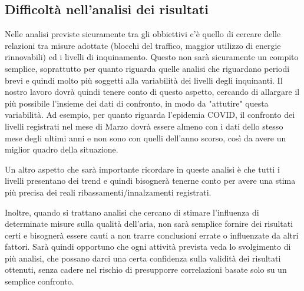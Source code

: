 \documentclass{article}
\begin{document}
\subsection{Difficoltà nell'analisi dei risultati}
Nelle analisi previste sicuramente tra gli obbiettivi c'è quello di cercare delle relazioni tra misure adottate (blocchi del traffico, maggior utilizzo di energie rinnovabili) ed i livelli di inquinamento. Questo non sarà sicuramente un compito semplice, soprattutto per quanto riguarda quelle analisi che riguardano periodi brevi e quindi molto più soggetti alla variabilità dei livelli degli inquinanti. Il nostro lavoro dovrà quindi tenere conto di questo aspetto, cercando di allargare il più possibile l'insieme dei dati di confronto, in modo da "attutire" questa variabilità. Ad esempio, per quanto riguarda l'epidemia COVID, il confronto dei livelli registrati nel mese di Marzo dovrà essere almeno con i dati dello stesso mese degli ultimi anni e non sono con quelli dell'anno scorso, così da avere un miglior quadro della situazione.

Un altro aspetto che sarà importante ricordare in queste analisi è che tutti i livelli presentano dei trend e quindi bisognerà tenerne conto per avere una stima più precisa dei reali ribassamenti/innalzamenti registrati.

Inoltre, quando si trattano analisi che cercano di stimare l'influenza di determinate misure sulla qualità dell'aria, non sarà semplice fornire dei risultati certi e bisognerà essere cauti a non trarre conclusioni errate o influenzate da altri fattori. Sarà quindi opportuno che ogni attività prevista veda lo svolgimento di più analisi, che possano darci una certa confidenza sulla validità dei risultati ottenuti, senza cadere nel rischio di presupporre correlazioni basate solo su un semplice confronto.

%
%
\label{bib-begin}
\printbibliography
\end{document}
